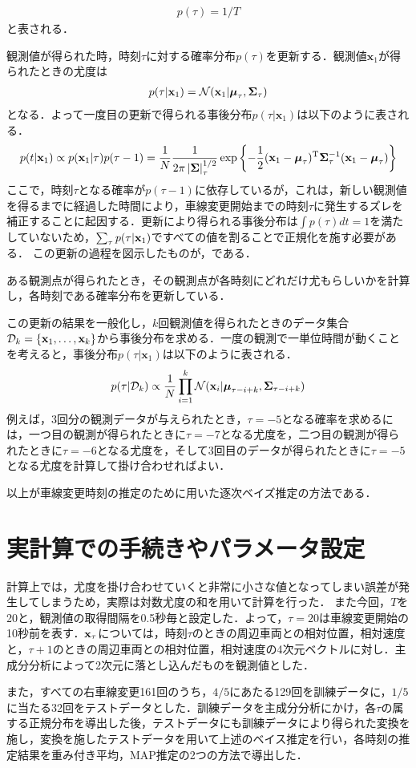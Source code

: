 \begin{align}
p(\tau)=1/T
\end{align}
と表される．
\par
観測値が得られた時，時刻$\tau$に対する確率分布$p(\tau)$を更新する．観測値$\mathbf{x}_1$が得られたときの尤度は
\begin{align}
	p(\tau|\mathbf{x}_1)=\mathcal{N}(\mathbf{x}_1|\boldsymbol{\mu}_\tau,\mathbf{\Sigma}_\tau)
\end{align}
となる．よって一度目の更新で得られる事後分布$p(\tau|\mathbf{x}_1)$は以下のように表される．
\begin{align}
	p(t|\mathbf{x}_1)\propto p(\mathbf{x}_1|\tau)p(\tau-1)=\frac{1}{N}\frac{1}{2\pi\left|\mathbf{\Sigma}\right|_\tau^{1/2}}\exp\left\{-\frac{1}{2}(\mathbf{x}_1-\boldsymbol{\mu}_\tau)^\mathrm{T}\mathbf{\Sigma}_\tau^{-1}(\mathbf{x}_1-\boldsymbol{\mu}_\tau)\right\}
\end{align}
ここで，時刻$\tau$となる確率が$p(\tau-1)$に依存しているが，これは，新しい観測値を得るまでに経過した時間により，車線変更開始までの時刻$\tau$に発生するズレを補正することに起因する．更新により得られる事後分布は$\int p(\tau)dt=1$を満たしていないため，$\sum_\tau p(\tau|\mathbf{x}_1)$ですべての値を割ることで正規化を施す必要がある．
この更新の過程を図示したものが，である．

ある観測点が得られたとき，その観測点が各時刻にどれだけ尤もらしいかを計算し，各時刻である確率分布を更新している．
\par
この更新の結果を一般化し，$k$回観測値を得られたときのデータ集合$\mathcal{D}_k=\{\mathbf{x}_1,\ldots,\mathbf{x}_k\}$から事後分布を求める．一度の観測で一単位時間が動くことを考えると，事後分布$p(\tau|\mathbf{x}_1)$は以下のように表される．
\begin{align}
	p(\tau|\mathcal{D}_k)\propto\frac{1}{N}\prod_{i=1}^k \mathcal{N}(\mathbf{x}_i|\boldsymbol{\mu}_{\tau-i+k}, \mathbf{\Sigma}_{\tau-i+k})
\end{align}
例えば，3回分の観測データが与えられたとき，$\tau=-5$となる確率を求めるには，一つ目の観測が得られたときに$\tau=-7$となる尤度を，二つ目の観測が得られたときに$\tau=-6$となる尤度を，そして3回目のデータが得られたときに$\tau=-5$となる尤度を計算して掛け合わせればよい．
\par
以上が車線変更時刻の推定のために用いた逐次ベイズ推定の方法である．
\section{実計算での手続きやパラメータ設定}
計算上では，尤度を掛け合わせていくと非常に小さな値となってしまい誤差が発生してしまうため，実際は対数尤度の和を用いて計算を行った．%
また今回，$T$を20と，観測値の取得間隔を0.5秒毎と設定した．よって，$\tau=20$は車線変更開始の10秒前を表す．$\mathbf{x}_\tau$については，時刻$\tau$のときの周辺車両との相対位置，相対速度と，$\tau+1$のときの周辺車両との相対位置，相対速度の4次元ベクトルに対し．主成分分析によって2次元に落とし込んだものを観測値とした．
\par
また，すべての右車線変更161回のうち，$4/5$にあたる129回を訓練データに，$1/5$に当たる32回をテストデータとした．訓練データを主成分分析にかけ，各$\tau$の属する正規分布を導出した後，テストデータにも訓練データにより得られた変換を施し，変換を施したテストデータを用いて上述のベイス推定を行い，各時刻の推定結果を重み付き平均，MAP推定の2つの方法で導出した．
